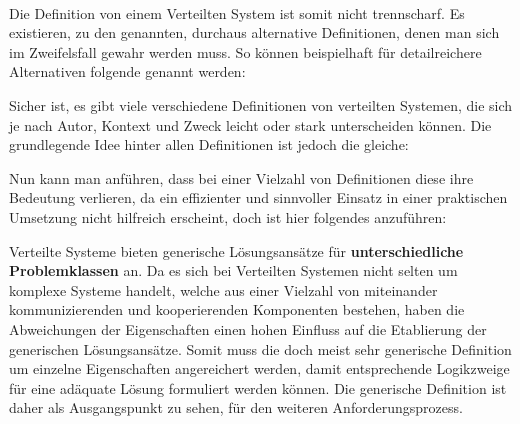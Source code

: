 \documentclass[../vs-script-first-v01.tex]{subfiles}
\begin{document}
\mbox{}\\
Die Definition von einem Verteilten System ist somit nicht trennscharf. Es existieren, zu den genannten, durchaus alternative Definitionen, denen man sich im Zweifelsfall gewahr werden muss. So können beispielhaft für detailreichere Alternativen folgende genannt werden:

Sicher ist, es gibt viele verschiedene Definitionen von verteilten Systemen, die sich je nach Autor, Kontext und Zweck leicht oder stark unterscheiden können. Die grundlegende Idee hinter allen Definitionen ist jedoch die gleiche: 


Nun kann man anführen, dass bei einer Vielzahl von Definitionen diese ihre Bedeutung verlieren, da ein effizienter und sinnvoller Einsatz in einer praktischen Umsetzung nicht hilfreich erscheint, doch ist hier folgendes anzuführen:

Verteilte Systeme bieten generische Lösungsansätze für \textbf{unterschiedliche Problemklassen} an. Da es sich bei Verteilten Systemen nicht selten um komplexe Systeme handelt, welche aus einer Vielzahl von miteinander kommunizierenden und kooperierenden Komponenten bestehen, haben die Abweichungen der Eigenschaften einen hohen Einfluss auf die Etablierung der generischen Lösungsansätze. Somit muss die doch meist sehr generische Definition um einzelne Eigenschaften angereichert werden, damit entsprechende Logikzweige für eine adäquate Lösung formuliert werden können. Die generische Definition ist daher als Ausgangspunkt zu sehen, für den weiteren Anforderungsprozess. 
\end{document}
